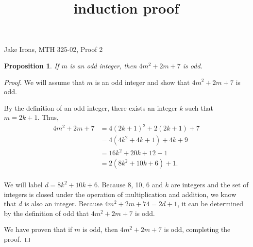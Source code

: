 \documentclass[11 pt]{article}
\title{induction proof}
\newtheorem{proposition}{Proposition}
\newcommand{\newpar}{\vspace{.15in}\noindent}
\begin{document}
\noindent Jake Irons, MTH 325-02, Proof 2

\newpar
\begin{proposition}
If $m$ is an odd integer, then $4m^2+2m+7$ is odd.
\end{proposition}
\begin{proof}
We will assume that $m$ is an odd integer and show that $4m^2+2m+7$ is odd.

\newpar
By the definition of an odd integer, there exists an integer $k$ such that $m=2k+1$. Thus,
\begin{align*}
4m^2+2m+7&=4(2k+1)^2+2(2k+1)+7 \\
&= 4(4k^2+4k+1)+4k+9 \\
&= 16k^2+20k+12+1 \\
&= 2(8k^2+10k+6)+1. \\
\end{align*}

\noindent
We will label $d=8k^2+10k+6$. Because 8, 10, 6 and $k$ are integers and the set of integers is closed under the operation of multiplication and addition, we know that $d$ is also an integer. Because $4m^2+2m+74=2d+1$, it can be determined by the definition of odd that $4m^2+2m+7$ is odd.

\newpar
We have proven that if $m$ is odd, then $4m^2+2m+7$ is odd, completing the proof.
\end{proof}
\end{document}
